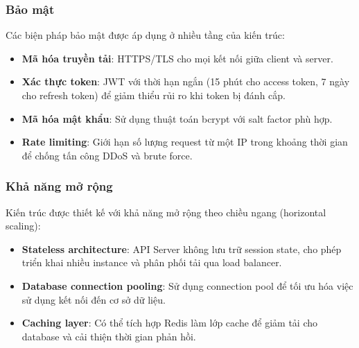 \subsubsection{Bảo mật}

Các biện pháp bảo mật được áp dụng ở nhiều tầng của kiến trúc:

\begin{itemize}
    \item \textbf{Mã hóa truyền tải}: HTTPS/TLS cho mọi kết nối giữa client và server.
    \item \textbf{Xác thực token}: JWT với thời hạn ngắn (15 phút cho access token, 7 ngày cho refresh token) để giảm thiểu rủi ro khi token bị đánh cắp.
    \item \textbf{Mã hóa mật khẩu}: Sử dụng thuật toán bcrypt với salt factor phù hợp.
    \item \textbf{Rate limiting}: Giới hạn số lượng request từ một IP trong khoảng thời gian để chống tấn công DDoS và brute force.
\end{itemize}

\subsubsection{Khả năng mở rộng}

Kiến trúc được thiết kế với khả năng mở rộng theo chiều ngang (horizontal scaling):

\begin{itemize}
    \item \textbf{Stateless architecture}: API Server không lưu trữ session state, cho phép triển khai nhiều instance và phân phối tải qua load balancer.
    \item \textbf{Database connection pooling}: Sử dụng connection pool để tối ưu hóa việc sử dụng kết nối đến cơ sở dữ liệu.
    \item \textbf{Caching layer}: Có thể tích hợp Redis làm lớp cache để giảm tải cho database và cải thiện thời gian phản hồi.
\end{itemize}

